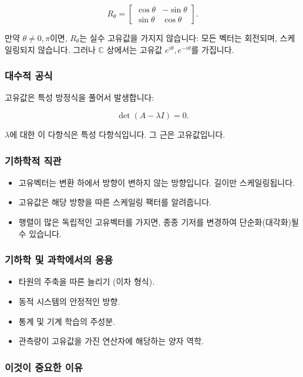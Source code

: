 \documentclass[
  12pt,
  a4paper,
]{article}
\begin{document}
\[R_\theta = \begin{bmatrix} \cos\theta & -\sin\theta \\ \sin\theta & \cos\theta \end{bmatrix}.\]

만약 \(\theta \neq 0, \pi\)이면, \(R_\theta\)는 실수 고유값을 가지지 않습니다: 모든 벡터는 회전되며, 스케일링되지 않습니다. 그러나 \(\mathbb{C}\) 상에서는 고유값 \(e^{i\theta}, e^{-i\theta}\)를 가집니다.

\subsubsection{대수적 공식}\label{algebraic-formulation}

고유값은 특성 방정식을 풀어서 발생합니다:

\[\det(A - \lambda I) = 0.\]

\(\lambda\)에 대한 이 다항식은 특성 다항식입니다. 그 근은 고유값입니다.

\subsubsection{기하학적 직관}\label{geometric-intuition}

\begin{itemize}
\item
  고유벡터는 변환 하에서 방향이 변하지 않는 방향입니다. 길이만 스케일링됩니다.
\item
  고유값은 해당 방향을 따른 스케일링 팩터를 알려줍니다.
\item
  행렬이 많은 독립적인 고유벡터를 가지면, 종종 기저를 변경하여 단순화(대각화)될 수 있습니다.
\end{itemize}

\subsubsection{기하학 및 과학에서의 응용}\label{applications-in-geometry-and-science}

\begin{itemize}
\item
  타원의 주축을 따른 늘리기 (이차 형식).
\item
  동적 시스템의 안정적인 방향.
\item
  통계 및 기계 학습의 주성분.
\item
  관측량이 고유값을 가진 연산자에 해당하는 양자 역학.
\end{itemize}

\subsubsection{이것이 중요한 이유}\label{why-this-matters-28}
\end{document}
